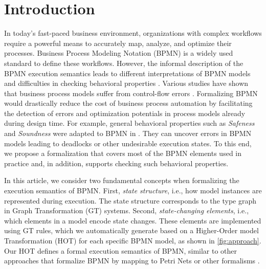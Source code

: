 \documentclass{lmcs} %
\begin{document}
\section{Introduction}
In today's fast-paced business environment, organizations with complex workflows require a powerful means to accurately map, analyze, and optimize their processes. 
Business Process Modeling Notation (BPMN) \cite{objectmanagementgroupBusinessProcessModel2013} is a widely used standard to define these workflows.
However, the informal description of the BPMN execution semantics leads to different interpretations of BPMN models and difficulties in checking behavioral properties \cite{corradiniFormalApproachAnalysis2021}.
Various studies have shown that business process models suffer from control-flow errors \cite{mendlingEmpiricalStudiesProcess2009}.
Formalizing BPMN would drastically reduce the cost of business process automation by facilitating the detection of errors and optimization potentials in process models already during design time.
For example, general behavioral properties such as \textit{Safeness} and \textit{Soundness} were adapted to BPMN in \cite{corradiniClassificationBPMNCollaborations2018}.
They can uncover errors in BPMN models leading to deadlocks or other undesirable execution states.
To this end, we propose a formalization that covers most of the BPMN elements used in practice and, in addition, supports checking such behavioral properties.

In this article, we consider two fundamental concepts when formalizing the execution semantics of BPMN.
First, \textit{state structure}, i.e., how model instances are represented during execution.
The state structure corresponds to the type graph in Graph Transformation (GT) systems.
Second, \textit{state-changing elements}, i.e., which elements in a model encode state changes.
These elements are implemented using GT rules, which we automatically generate based on a Higher-Order model Transformation (HOT) \cite{tisiUseHigherOrderModel2009} for each specific BPMN model, as shown in \autoref{fig:approach}.
Our HOT defines a formal execution semantics of BPMN, similar to other approaches that formalize BPMN by mapping to Petri Nets or other formalisms \cite{dijkmanSemanticsAnalysisBusiness2008}.
\end{document}
